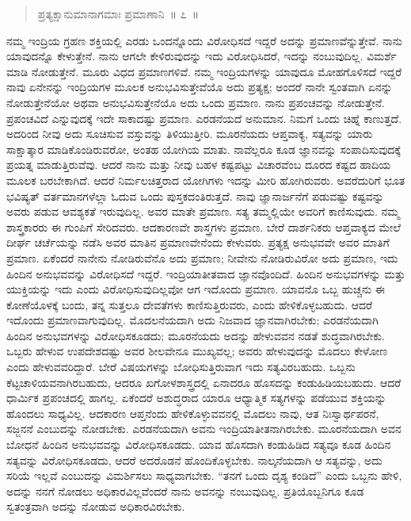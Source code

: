 \vspace{-0.1cm}


\vspace{-0.2cm}

\begin{verse}
ಪ್ರತ್ಯಕ್ಷಾನುಮಾನಾಗಮಾಃ ಪ್ರಮಾಣಾನಿ~॥ ೭~॥
\end{verse}

\vspace{-0.1cm}


\vskip 6pt

ನಮ್ಮ ಇಂದ್ರಿಯ ಗ್ರಹಣ ಶಕ್ತಿಯಲ್ಲಿ ಎರಡು ಒಂದನ್ನೊಂದು ವಿರೋಧಿಸದೆ ಇದ್ದರೆ ಅದನ್ನು ಪ್ರಮಾಣವೆನ್ನುತ್ತೇವೆ. ನಾನು ಯಾವುದನ್ನೊ ಕೇಳುತ್ತೇನೆ. ನಾನು ಆಗಲೇ ಕೇಳಿರುವುದನ್ನು ಇದು ವಿರೋಧಿಸಿದರೆ, ಇದನ್ನು ನಂಬುವುದಿಲ್ಲ. ವಿಮರ್ಶೆ ಮಾಡಿ ನೋಡುತ್ತೇನೆ. ಮೂರು ವಿಧದ ಪ್ರಮಾಣಗಳಿವೆ. ನಮ್ಮ ಇಂದ್ರಿಯಗಳನ್ನು ಯಾವುದೂ ಮೋಹಗೊಳಿಸದೆ ಇದ್ದರೆ ನಾವು ಏನೇನನ್ನು ಇಂದ್ರಿಯಗಳ ಮೂಲಕ ಅನುಭವಿಸುತ್ತೇವೆಯೊ ಅದು ಪ್ರತ್ಯಕ್ಷ; ಅಂದರೆ ನಾನೇ ಸ್ವಂತವಾಗಿ ಏನನ್ನು ನೋಡುತ್ತೇನೆಯೋ ಅಥವಾ ಅನುಭವಿಸುತ್ತೇನೆಯೊ ಅದು ಒಂದು ಪ್ರಮಾಣ. ನಾನು ಪ್ರಪಂಚವನ್ನು ನೋಡುತ್ತೇನೆ. ಪ್ರಪಂಚವಿದೆ ಎನ್ನುವುದಕ್ಕೆ ಇದೇ ಸಾಕಾದಷ್ಟು ಪ್ರಮಾಣ. ಎರಡನೆಯದೆ ಅನುಮಾನ. ನಿಮಗೆ ಒಂದು ಚಿಹ್ನೆ ಕಾಣುತ್ತದೆ. ಅದರಿಂದ ನೀವು ಅದು ಸೂಚಿಸುವ ವಸ್ತುವನ್ನು ತಿಳಿಯುತ್ತೀರಿ. ಮೂರನೆಯದು ಆಪ್ತವಾಕ್ಯ, ಸತ್ಯವನ್ನು ಯಾರು ಸಾಕ್ಷಾತ್ಕಾರ ಮಾಡಿಕೊಂಡಿರುವರೋ, ಅಂತಹ ಯೋಗಿಯ ಮಾತು. ನಾವೆಲ್ಲರೂ ಕೂಡ ಜ್ಞಾನವನ್ನು ಸಂಪಾದಿಸುವುದಕ್ಕೆ ಪ್ರಯತ್ನ ಮಾಡುತ್ತಿರುವೆವು. ಆದರೆ ನಾನು ಮತ್ತು ನೀವು ಬಹಳ ಕಷ್ಟಪಟ್ಟು ವಿಚಾರವೆಂಬ ದೂರದ ಕಷ್ಟದ ಹಾದಿಯ ಮೂಲಕ ಬರಬೇಕಾಗಿದೆ. ಆದರೆ ನಿರ್ಮಲಚಿತ್ತರಾದ ಯೋಗಿಗಳು ಇದನ್ನು ಮೀರಿ ಹೋಗಿರುವರು. ಅವರೆದುರಿಗೆ ಭೂತ ಭವಿಷ್ಯತ್​ ವರ್ತಮಾನಗಳೆಲ್ಲಾ ಓದುವ ಒಂದು ಪುಸ್ತಕದಂತಿರುತ್ತದೆ. ನಾವು ಜ್ಞಾನಾರ್ಜನೆಗೆ ಪಡುವಷ್ಟು ಕಷ್ಟವನ್ನು ಅವರು ಪಡುವ ಆವಶ್ಯಕತೆ ಇರುವುದಿಲ್ಲ. ಅವರ ಮಾತೇ ಪ್ರಮಾಣ. ಸತ್ಯ ತಮ್ಮಲ್ಲಿಯೇ ಅವರಿಗೆ ಕಾಣಿಸುವುದು. ನಮ್ಮ ಶಾಸ್ತ್ರಕಾರರು ಈ ಗುಂಪಿಗೆ ಸೇರಿದವರು. ಆದಕಾರಣವೇ ಶಾಸ್ತ್ರಗಳು ಪ್ರಮಾಣ. ಬೇರೆ ದಾರ್ಶನಿಕರು ಆಪ್ತವಾಕ್ಯದ ಮೇಲೆ ದೀರ್ಘ ಚರ್ಚೆಯನ್ನು ನಡೆಸಿ ಅವರ ಮಾತಿನ ಪ್ರಮಾಣವೇನೆಂದು ಕೇಳುವರು. ಪ್ರತ್ಯಕ್ಷ ಅನುಭವವೇ ಅವರ ಮಾತಿಗೆ ಪ್ರಮಾಣ. ಏಕೆಂದರೆ ನಾನೇನು ನೋಡಿರುವೆನೊ ಅದು ಪ್ರಮಾಣ; ನೀವೇನು ನೋಡಿರುವಿರೋ ಅದು ಪ್ರಮಾಣ, ಇದು ಹಿಂದಿನ ಅನುಭವವನ್ನು ವಿರೋಧಿಸದೆ ಇದ್ದರೆ. ಇಂದ್ರಿಯಾತೀತವಾದ ಜ್ಞಾನವೊಂದಿದೆ. ಹಿಂದಿನ ಅನುಭವಗಳನ್ನು ಮತ್ತು ಯುಕ್ತಿಯನ್ನು ಇದು ಎಂದು ವಿರೋಧಿಸುವುದಿಲ್ಲವೋ ಆಗ ಇದೊಂದು ಪ್ರಮಾಣ. ಯಾವನೊ ಒಬ್ಬ ಹುಚ್ಚನು ಈ ಕೋಣೆಯೊಳಕ್ಕೆ ಬಂದು, ತನ್ನ ಸುತ್ತಲೂ ದೇವತೆಗಳು ಕಾಣಿಸುತ್ತಿರುವರು, ಎಂದು ಹೇಳಿಕೊಳ್ಳಬಹುದು. ಆದರೆ ಇದೊಂದು ಪ್ರಮಾಣವಾಗುವುದಿಲ್ಲ. ಮೊದಲನೆಯದಾಗಿ ಅದು ನಿಜವಾದ ಜ್ಞಾನವಾಗಿರಬೇಕು; ಎರಡನೆಯದಾಗಿ ಹಿಂದಿನ ಅನುಭವಗಳನ್ನು ವಿರೋಧಿಸಕೂಡದು; ಮೂರನೆಯದು ಅದನ್ನು ಹೇಳುವವನ ನಡತೆ ಶುದ್ಧವಾಗಿರಬೇಕು. ಒಬ್ಬರು ಹೇಳುವ ಉಪದೇಶದಷ್ಟು ಅವರ ಶೀಲವೇನೂ ಮುಖ್ಯವಲ್ಲ; ಅವರು ಹೇಳುವುದನ್ನು ಮೊದಲು ಕೇಳೋಣ ಎಂದು ಹೇಳುವವರಿದ್ದಾರೆ. ಬೇರೆ ವಿಷಯಗಳನ್ನು ಬೋಧಿಸುತ್ತಿರುವಾಗ ಇದು ಸತ್ಯವಿರಬಹುದು. ಒಬ್ಬನು ಕೆಟ್ಟಚಾಳಿಯವನಾಗಿರಬಹುದು, ಆದರೂ ಖಗೋಳಶಾಸ್ತ್ರದಲ್ಲಿ ಏನಾದರೂ ಹೊಸದನ್ನು ಕಂಡುಹಿಡಿಯಬಹುದು. ಆದರೆ ಧಾರ್ಮಿಕ ಪ್ರಪಂಚದಲ್ಲಿ ಹಾಗಲ್ಲ. ಏಕೆಂದರೆ ಅಶುದ್ಧರಾದ ಯಾರೂ ಆಧ್ಯಾತ್ಮಿಕ ಸತ್ಯಗಳನ್ನು ಪಡೆಯುವ ಶಕ್ತಿಯನ್ನು ಹೊಂದಲು ಸಾಧ್ಯವಿಲ್ಲ. ಆದಕಾರಣ ಆಪ್ತನೆಂದು ಹೇಳಿಕೊಳ್ಳುವವನಲ್ಲಿ ಮೊದಲು ನಾವು, ಆತ ನಿಃಸ್ವಾರ್ಥಪರನೆ, ಸಜ್ಜನನೆ ಎಂಬುದನ್ನು ನೋಡಬೇಕು. ಎರಡನೆಯದಾಗಿ ಅವನು ಇಂದ್ರಿಯಾತೀತನಾಗಿರಬೇಕು. ಮೂರನೆಯದಾಗಿ ಅವನ ಬೋಧನೆ ಹಿಂದಿನ ಅನುಭವವನ್ನು ವಿರೋಧಿಸಕೂಡದು. ಯಾವ ಹೊಸದಾಗಿ ಕಂಡುಹಿಡಿದ ಸತ್ಯವೂ ಕೂಡ ಹಿಂದಿನ ಸತ್ಯವನ್ನು ವಿರೋಧಿಸಕೂಡದು, ಆದರೆ ಅದರೊಡನೆ ಹೊಂದಿಕೊಳ್ಳಬೇಕು. ನಾಲ್ಕನೆಯದಾಗಿ ಆ ಸತ್ಯವನ್ನು, ಅದು ಸರಿಯೆ ಇಲ್ಲವೆ ಎಂಬುದನ್ನು ವಿಮರ್ಶಿಸಲು ಸಾಧ್ಯವಾಗಬೇಕು. “ತನಗೆ ಒಂದು ದೃಶ್ಯ ಕಂಡಿದೆ” ಎಂದು ಒಬ್ಬನು ಹೇಳಿ, ಅದನ್ನು ನನಗೆ ನೋಡಲು ಅಧಿಕಾರವಿಲ್ಲವೆಂದರೆ ನಾನು ಅವನನ್ನು ನಂಬುವುದಿಲ್ಲ. ಪ್ರತಿಯೊಬ್ಬನಿಗೂ ಕೂಡ ಸ್ವತಂತ್ರವಾಗಿ ಅದನ್ನು ನೋಡುವ ಅಧಿಕಾರವಿರಬೇಕು. 